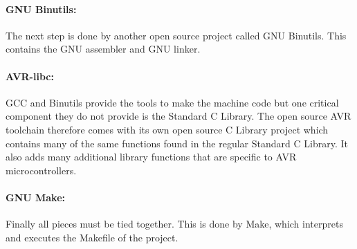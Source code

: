 \paragraph{GNU Binutils: }The next step is done by another open source project called GNU Binutils. This contains the GNU assembler and GNU linker.
\paragraph{AVR-libc:} GCC and Binutils provide the tools to make the machine code but one critical component they do not provide is the Standard C Library. The open source AVR toolchain therefore comes with its own open source C Library project which contains many of the same functions found in the regular Standard C Library. It also adds many additional library functions that are specific to  AVR microcontrollers.
\paragraph{GNU Make:} Finally all pieces must be tied together. This is done by Make, which interprets and executes the Makefile of the project.
